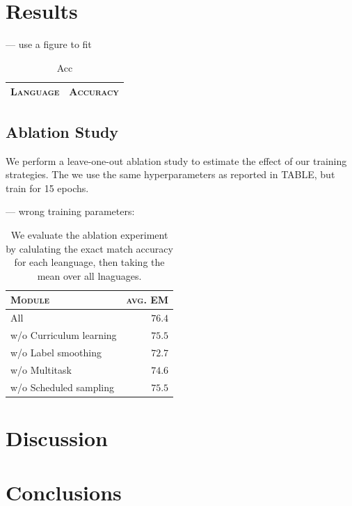 \documentclass[11pt,a4paper]{article}
\newcommand\jp[1]{\textbf{JP: #1}}
\begin{document}
\section{Results}

--- use a figure to fit
\begin{table}[h]	
\centering
\begin{tabular}{lc}
\textsc{Language} & \textsc{Accuracy} \\
  \hline
  
\end{tabular} 
\caption{Acc}
\label{tab:accuracy}
\end{table}



\subsection{Ablation Study}

We perform a leave-one-out ablation study to estimate the effect of
our training strategies. The we use the same hyperparameters as
reported in TABLE, but train for 15 epochs.


--- wrong training parameters:
\begin{table}[h]	
\centering
\begin{tabular}{lr}
\textsc{Module} & \textsc{avg. EM}\\
  \hline
  All  & $76.4$ \\
  w/o Curriculum learning & $75.5$\\
  w/o Label smoothing & $72.7$\\
  w/o Multitask & $74.6$ \\
  w/o Scheduled sampling & $75.5$ \\
  
  
\end{tabular} 
\caption{We evaluate the ablation experiment by calulating the exact
match accuracy for each leanguage, then taking the mean over all
lnaguages.}
\label{tab:abl}
\end{table}

\section{Discussion}




\section{Conclusions}



 



\end{document}
